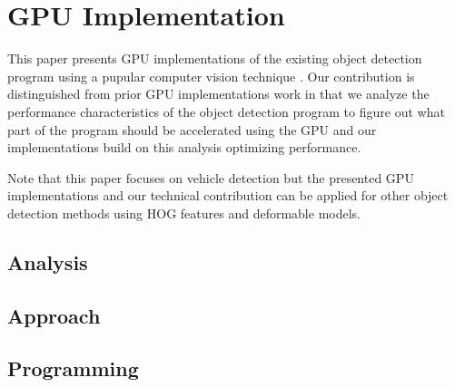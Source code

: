 \section{GPU Implementation}
\label{sec:implementation}

This paper presents GPU implementations of the existing object
detection program using a pupular computer vision technique
\cite{Niknejad12}.
Our contribution is distinguished from prior GPU implementations work
\cite{Chen11, Prisacariu09} in that we analyze the performance
characteristics of the object detection program to figure out what part
of the program should be accelerated using the GPU and our
implementations build on this analysis optimizing performance.

Note that this paper focuses on vehicle detection but the presented GPU
implementations and our technical contribution can be applied for other
object detection methods using HOG features and deformable models.

\subsection{Analysis}

\subsection{Approach}

\subsection{Programming}